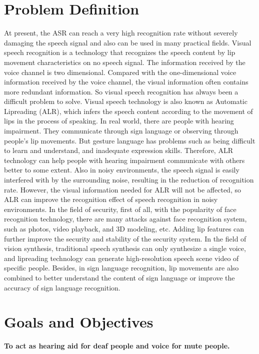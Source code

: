         \newpage
        \section{Problem Definition}
        At present, the ASR can reach a very high recognition rate without severely damaging the speech signal and also can be used in many practical fields. Visual speech recognition is a technology that recognizes the speech content by lip movement characteristics on no speech signal. The information received by the voice channel is two dimensional. Compared with the one-dimensional voice information received by the voice channel, the visual information often contains more redundant information. So visual speech recognition has always been a difficult problem to solve. Visual speech technology is also known as Automatic Lipreading (ALR), which infers the speech content according to the movement of lips in the process of speaking. In real world, there are people with hearing impairment. They communicate through sign language or observing through people’s lip movements. But gesture language has problems such as being difficult to learn and understand, and inadequate expression skills. Therefore, ALR technology can help people with hearing impairment communicate with others better to some extent. Also in noisy environments, the speech signal is easily interfered with by the surrounding noise, resulting in the reduction of recognition rate. However, the visual information needed for ALR will not be affected, so ALR can improve the recognition effect of speech recognition in noisy environments. In the field of security, first of all, with the popularity of face recognition technology, there are many attacks against face recognition system, such as photos, video playback, and 3D modeling, etc. Adding lip features can further improve the security and stability of the security system. In the field of vision synthesis, traditional speech synthesis can only synthesize a single voice, and lipreading technology can generate high-resolution speech scene video of specific people. Besides, in sign language recognition, lip movements are also combined to better understand the content of sign language or improve the accuracy of sign language recognition.
        \section{Goals and Objectives}
        \textbf{To act as hearing aid for deaf people and voice for mute people.}      